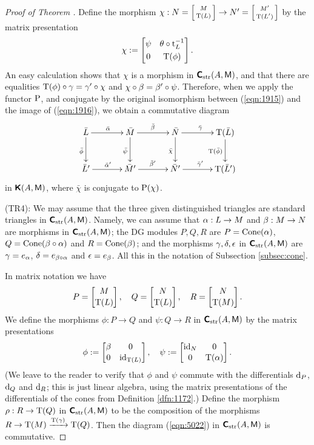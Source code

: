 \begin{proof}[Proof of Theorem \tup{\ref{thm:1255}}]
Define the morphism 
$\chi : N = \left[ \begin{smallmatrix}  M \\[0.2em] \operatorname{T}(L)  \end{smallmatrix} \right] \to 
N' = \left[ \begin{smallmatrix}  M' \\[0.2em] \operatorname{T}(L')  \end{smallmatrix} \right]$
by the matrix presentation 
\[ \chi :=  
\begin{bmatrix}  \psi & \theta \circ \operatorname{t}_{L}^{-1} \\[0.3em] 0 & \operatorname{T}(\phi)  \end{bmatrix} . \]
An easy calculation shows that $\chi$ is a morphism in 
$\boldsymbol{\mathsf{C}}_{\mathrm{str}}(A, \operatorname{\mathsf{M}})$, and that there are equalities
$\operatorname{T}(\phi) \circ \gamma = \gamma' \circ \chi$
and 
$\chi \circ \beta = \beta' \circ \psi$. 
Therefore, when we apply the functor $\operatorname{P}$, and conjugate by the original 
isomorphism between (\ref{eqn:1915}) and the image of (\ref{eqn:1916}), 
we obtain a commutative diagram 
\[ \UseTips \xymatrix @C=8ex @R=6ex { 
\bar{L} 
\ar[r]^{\bar{\al}}
\ar[d]_{\bar{\phi}}
&
\bar{M}
\ar[r]^{\bar{\be}}
\ar[d]_{\bar{\psi}}
& 
\bar{N}
\ar[r]^{\bar{\ga}}
\ar[d]_{\bar{\chi}}
&
\opn{T}(\bar{L})
\ar[d]_{\opn{T}(\bar{\phi})}
\\
\bar{L}' 
\ar[r]^{\bar{\al}'}
&
\bar{M}'
\ar[r]^{\bar{\be}'}
& 
\bar{N}'
\ar[r]^{\bar{\ga}'}
&
\opn{T}(\bar{L}') 
} \]
in $\boldsymbol{\mathsf{K}}(A, \operatorname{\mathsf{M}})$, where $\bar{\chi}$ is conjugate to
$\operatorname{P}(\chi)$. 

\medskip \noindent
(TR4): We may assume that the three given distinguished triangles are 
standard triangles in $\boldsymbol{\mathsf{C}}_{\mathrm{str}}(A, \operatorname{\mathsf{M}})$. 
Namely, we can assume that 
$\alpha : L \to M$ and $\beta : M \to N$ are morphisms in 
$\boldsymbol{\mathsf{C}}_{\mathrm{str}}(A, \operatorname{\mathsf{M}})$; the DG modules $P, Q, R$ are 
$P = \operatorname{Cone}(\alpha)$, 
$Q = \operatorname{Cone}(\beta \circ \alpha)$ and
$R = \operatorname{Cone}(\beta)$; and the morphisms $\gamma, \delta, \epsilon$ in 
$\boldsymbol{\mathsf{C}}_{\mathrm{str}}(A, \operatorname{\mathsf{M}})$ are
$\gamma = e_{\alpha}$, $\delta = e_{\beta \circ \alpha}$ and 
$\epsilon = e_{\beta}$. All this in the notation of Subsection \ref{subsec:cone}. 

In matrix notation we have
\[ P = \begin{bmatrix} M \\[0.1em] \operatorname{T}(L) \end{bmatrix} , \quad 
Q = \begin{bmatrix} N \\[0.1em] \operatorname{T}(L) \end{bmatrix} , \quad 
R = \begin{bmatrix} N \\[0.1em] \operatorname{T}(M) \end{bmatrix} . \]
We define the morphisms 
$\phi : P \to Q$ and $\psi : Q \to R$ in $\boldsymbol{\mathsf{C}}_{\mathrm{str}}(A, \operatorname{\mathsf{M}})$ 
by the matrix presentations 
\[ \phi := \begin{bmatrix} \beta & 0 \\[0.1em] 0 & \operatorname{id}_{\operatorname{T}(L)} \end{bmatrix} , \quad 
\psi := \begin{bmatrix} \operatorname{id}_{N} & 0 \\[0.1em] 0 & \operatorname{T}(\alpha) \end{bmatrix} . \]
(We leave to the reader to verify that $\phi$ and $\psi$ commute with the 
differentials $\mathrm{d}_P$, $\mathrm{d}_Q$ and $\mathrm{d}_R$; this is just linear algebra, using 
the matrix presentations of the differentials of the cones from Definition 
\ref{dfn:1172}.)
Define the morphism 
$\rho : R \to \operatorname{T}(Q)$ in $\boldsymbol{\mathsf{C}}_{\mathrm{str}}(A, \operatorname{\mathsf{M}})$
to be the composition of the morphisms 
$R \to \operatorname{T}(M) \xrightarrow{\operatorname{T}(\gamma)} \operatorname{T}(Q)$.
Then the diagram (\ref{eqn:5022}) in $\boldsymbol{\mathsf{C}}_{\mathrm{str}}(A, \operatorname{\mathsf{M}})$ is 
commutative.


\end{proof}
